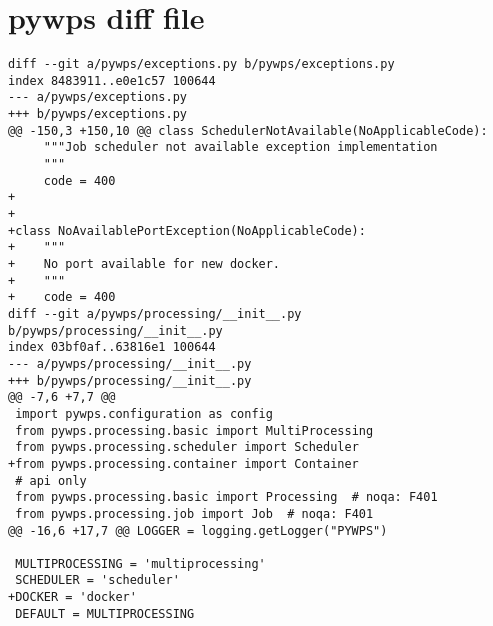 \newpage
\section{pywps diff file}
\begin{lstlisting}[basicstyle=\small,caption={pywps diff file}]
diff --git a/pywps/exceptions.py b/pywps/exceptions.py
index 8483911..e0e1c57 100644
--- a/pywps/exceptions.py
+++ b/pywps/exceptions.py
@@ -150,3 +150,10 @@ class SchedulerNotAvailable(NoApplicableCode):
     """Job scheduler not available exception implementation
     """
     code = 400
+
+
+class NoAvailablePortException(NoApplicableCode):
+    """
+    No port available for new docker.
+    """
+    code = 400
diff --git a/pywps/processing/__init__.py b/pywps/processing/__init__.py
index 03bf0af..63816e1 100644
--- a/pywps/processing/__init__.py
+++ b/pywps/processing/__init__.py
@@ -7,6 +7,7 @@
 import pywps.configuration as config
 from pywps.processing.basic import MultiProcessing
 from pywps.processing.scheduler import Scheduler
+from pywps.processing.container import Container
 # api only
 from pywps.processing.basic import Processing  # noqa: F401
 from pywps.processing.job import Job  # noqa: F401
@@ -16,6 +17,7 @@ LOGGER = logging.getLogger("PYWPS")
 
 MULTIPROCESSING = 'multiprocessing'
 SCHEDULER = 'scheduler'
+DOCKER = 'docker'
 DEFAULT = MULTIPROCESSING
 

\end{lstlisting}
